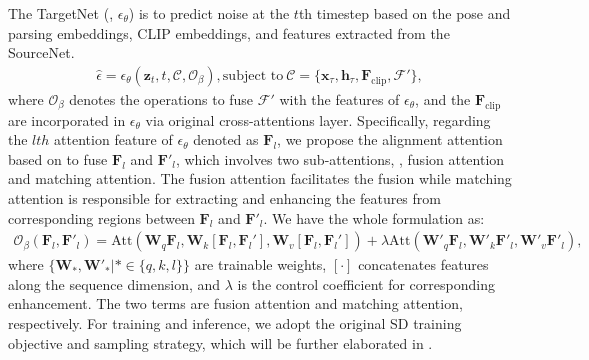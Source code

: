 The TargetNet (\ie, $\epsilon_\theta$) is to predict noise at the $t$th timestep based on the pose and parsing embeddings, CLIP embeddings, and features extracted from the SourceNet.
%
\begin{align}\label{eq:targetnet}
    \hat{\epsilon} = \epsilon_\theta(\mathbf{z}_t, t, \mathcal{C},\mathcal{O}_\beta), 
    \text{subject to}~\mathcal{C}=\{\mathbf{x}_\tau,\mathbf{h}_\tau,\mathbf{F}_\text{clip},\mathcal{F}'\},
\end{align}
%
where $\mathcal{O}_\beta$ denotes the operations to fuse $\mathcal{F}'$ with the features of $\epsilon_{\theta}$, and the $\mathbf{F}_\text{clip}$ are incorporated in $\epsilon_{\theta}$ via original cross-attentions layer.
%
Specifically, regarding the $lth$ attention feature of $\epsilon_{\theta}$ denoted as $\mathbf{F}_l$, we propose the alignment attention based on \cite{xu2023magicanimate} to fuse $\mathbf{F}_l$ and $\mathbf{F}'_l$, which involves two sub-attentions, \ie, fusion attention and matching attention. The fusion attention facilitates the fusion while matching attention is responsible for extracting and enhancing the features from corresponding regions between $\mathbf{F}_l$ and $\mathbf{F}'_l$. We have the whole formulation as:
%
\begin{align} \label{eq:alignment_attention}
      \mathcal{O}_{\beta}(\mathbf{F}_l, \mathbf{F}'_l) = 
      \text{Att}(\mathbf{W}_q \mathbf{F}_l, \mathbf{W}_k\left[\mathbf{F}_l,\mathbf{F}_l'\right],
      \mathbf{W}_v\left[\mathbf{F}_l,\mathbf{F}_l'\right])+
      \lambda\text{Att}(\mathbf{W}'_{q} \mathbf{F}_l, \mathbf{W}'_{k}\mathbf{F}'_l,\mathbf{W}'_{v} \mathbf{F}'_l), 
\end{align}
%
where $\{\mathbf{W}_*, \mathbf{W}'_* | *\in \{q,k,l\}\}$ are trainable weights, $[ \cdot ]$ concatenates features along the sequence dimension, and $\lambda$ is the control coefficient for corresponding enhancement. The two terms are fusion attention and matching attention, respectively.
For training and inference, we adopt the original SD training objective and sampling strategy, which will be further elaborated in .


